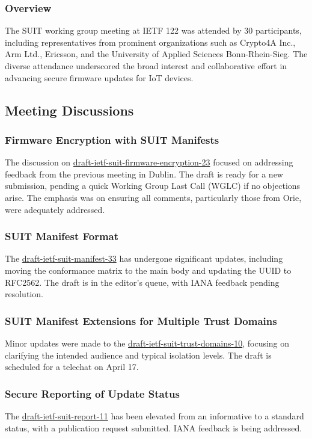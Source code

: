\documentclass{article}
\begin{document}
\subsubsection{Overview}
The SUIT working group meeting at IETF 122 was attended by 30 participants, including representatives from prominent organizations such as Crypto4A Inc., Arm Ltd., Ericsson, and the University of Applied Sciences Bonn-Rhein-Sieg. The diverse attendance underscored the broad interest and collaborative effort in advancing secure firmware updates for IoT devices.

\subsection{Meeting Discussions}

\subsubsection{Firmware Encryption with SUIT Manifests}
The discussion on \href{https://datatracker.ietf.org/doc/html/draft-ietf-suit-firmware-encryption-23}{draft-ietf-suit-firmware-encryption-23} focused on addressing feedback from the previous meeting in Dublin. The draft is ready for a new submission, pending a quick Working Group Last Call (WGLC) if no objections arise. The emphasis was on ensuring all comments, particularly those from Orie, were adequately addressed.

\subsubsection{SUIT Manifest Format}
The \href{https://datatracker.ietf.org/doc/html/draft-ietf-suit-manifest-33}{draft-ietf-suit-manifest-33} has undergone significant updates, including moving the conformance matrix to the main body and updating the UUID to RFC2562. The draft is in the editor's queue, with IANA feedback pending resolution.

\subsubsection{SUIT Manifest Extensions for Multiple Trust Domains}
Minor updates were made to the \href{https://datatracker.ietf.org/doc/html/draft-ietf-suit-trust-domains-10}{draft-ietf-suit-trust-domains-10}, focusing on clarifying the intended audience and typical isolation levels. The draft is scheduled for a telechat on April 17.

\subsubsection{Secure Reporting of Update Status}
The \href{https://datatracker.ietf.org/doc/html/draft-ietf-suit-report-11}{draft-ietf-suit-report-11} has been elevated from an informative to a standard status, with a publication request submitted. IANA feedback is being addressed.
\end{document}
